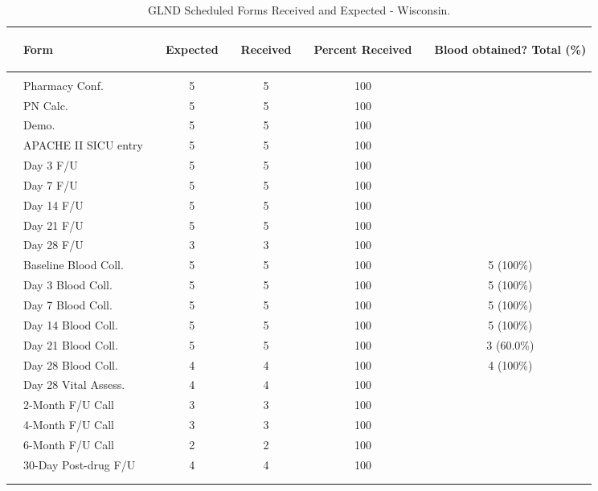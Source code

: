 \documentclass[dvips,10pt]{article}
\begin{document}
\clearpage
\begin{table}[t]
\caption
{ GLND Scheduled Forms Received and Expected - Wisconsin. }
\begin{center}
\begin{tabular}{ @{}l@{}
@{}l@{}@{}p{1.5em}@{}@{}c@{}@{}p{1.5em}@{}@{}c@{}@{}p{1.5em}@{}@{}c@{}@{}p{1.5em}@{}@{}c@{}
}
\hline

& \parbox{6em}{\begin{center}Form\end{center}} && \parbox{6em}{\begin{center}Expected\end{center}} && \parbox{6em}{\begin{center}Received\end{center}} && \parbox{6em}{\begin{center}Percent Received\end{center}} && \parbox{6em}{\begin{center}Blood obtained? Total (\%)\end{center}} \\

\hline

\\
& Pharmacy Conf. && 5 && 5 && 100 &&  \\
& PN Calc. && 5 && 5 && 100 &&  \\
& Demo. && 5 && 5 && 100 &&  \\
& APACHE II SICU entry && 5 && 5 && 100 &&  \\
& Day 3 F/U && 5 && 5 && 100 &&  \\
& Day 7 F/U && 5 && 5 && 100 &&  \\
& Day 14 F/U && 5 && 5 && 100 &&  \\
& Day 21 F/U && 5 && 5 && 100 &&  \\
& Day 28 F/U && 3 && 3 && 100 &&  \\
& Baseline Blood Coll. && 5 && 5 && 100 && 5 (100\%) \\
& Day 3 Blood Coll. && 5 && 5 && 100 && 5 (100\%) \\
& Day 7 Blood Coll. && 5 && 5 && 100 && 5 (100\%) \\
& Day 14 Blood Coll. && 5 && 5 && 100 && 5 (100\%) \\
& Day 21 Blood Coll. && 5 && 5 && 100 && 3 (60.0\%) \\
& Day 28 Blood Coll. && 4 && 4 && 100 && 4 (100\%) \\
& Day 28 Vital Assess. && 4 && 4 && 100 &&  \\
& 2-Month F/U Call && 3 && 3 && 100 &&  \\
& 4-Month F/U Call && 3 && 3 && 100 &&  \\
& 6-Month F/U Call && 2 && 2 && 100 &&  \\
& 30-Day Post-drug F/U && 4 && 4 && 100 &&  \\
\\
\hline \\

\end{tabular}

\end{center}
 \end{table}
\clearpage
\end{document}
